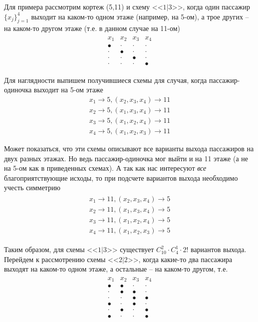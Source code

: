 \documentclass[%
	11pt,
	a4paper,
	utf8,
		]{article}
\begin{document}
Для примера рассмотрим кортеж (5,11) и схему <<$ 1 | 3 $>>, когда один пассажир $ \{x_j\}_{j=1}^4 $ выходит на каком-то одном этаже (например, на 5-ом), а трое других -- на каком-то другом этаже (т.е. в данном случае на 11-ом)
\begin{align*}
	\begin{matrix}
		x_1 & x_2 & x_3 & x_4 \\
		\bullet & \cdot & \cdot & \cdot \\
		\cdot & \bullet & \cdot & \cdot \\
		\cdot & \cdot & \bullet & \cdot \\
		\cdot & \cdot & \cdot & \bullet 
	\end{matrix}
\end{align*}

Для наглядности выпишем получившиеся схемы для случая, когда пассажир-одиночка выходит на 5-ом этаже
\begin{align*}
	x_1 \rightarrow 5, (x_2, x_3, x_4) \rightarrow 11\\
	x_2 \rightarrow 5, (x_1, x_3, x_4) \rightarrow 11\\
	x_3 \rightarrow 5, (x_1, x_2, x_4) \rightarrow 11\\
	x_4 \rightarrow 5, (x_1, x_2, x_3) \rightarrow 11
\end{align*}

Может показаться, что эти схемы описывают все варианты выхода пассажиров на двух разных этажах. Но ведь пассажир-одиночка мог выйти и на 11 этаже (а не на 5-ом как в приведенных схемах). А так как нас интересуют \emph{все} благоприятствующие исходы, то при подсчете вариантов выхода необходимо учесть симметрию
\begin{align*}
	\begin{matrix}
		x_1 \rightarrow 11, (x_2, x_3, x_4) \rightarrow 5\\
		x_2 \rightarrow 11, (x_1, x_3, x_4) \rightarrow 5\\
		x_3 \rightarrow 11, (x_1, x_2, x_4) \rightarrow 5\\
		x_4 \rightarrow 11, (x_1, x_2, x_3) \rightarrow 5
	\end{matrix}
\end{align*}

Таким образом, для схемы <<$ 1|3 $>> существует $ C_{10}^2 \cdot C_4^1 \cdot 2! $ вариантов выхода. Перейдем к рассмотрению схемы <<$ 2 | 2 $>>, когда какие-то два пассажира выходят на каком-то одном этаже, а остальные -- на каком-то другом, т.е.
\begin{align*}
	\begin{matrix}
		x_1 & x_2 & x_3 & x_4 \\
		\bullet & \bullet & \cdot & \cdot \\
		\cdot & \bullet & \bullet & \cdot \\
		\cdot & \cdot & \bullet & \bullet \\
		\bullet & \cdot & \bullet & \cdot \\
		\cdot & \bullet & \cdot & \bullet \\
		\bullet & \cdot & \cdot & \bullet \\
	\end{matrix}
\end{align*}
\end{document}
